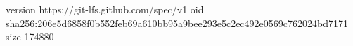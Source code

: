 version https://git-lfs.github.com/spec/v1
oid sha256:206e5d6858f0b552feb69a610bb95a9bee293e5c2ec492e0569c762024bd7171
size 174880
